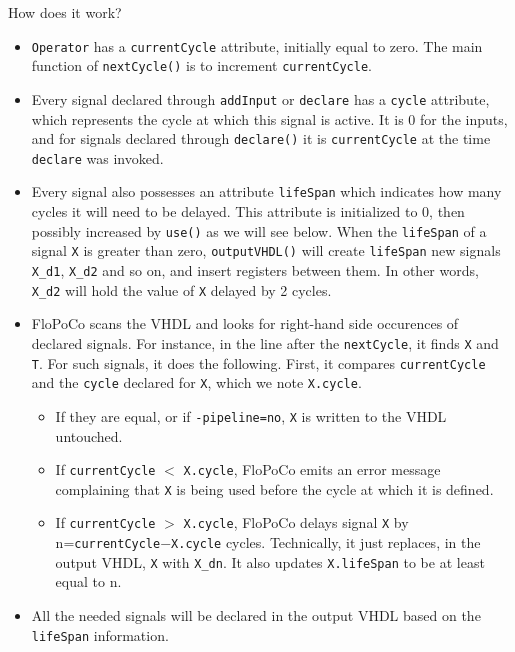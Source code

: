 \documentclass{article}
\begin{document}
How does it work? 
\begin{itemize}\item 
  \verb!Operator! has a \verb!currentCycle! attribute, initially equal to
  zero. The main function of 	\verb!nextCycle()! is to increment \verb!currentCycle!.

\item Every signal declared through \verb!addInput! or \verb!declare!
  has a \verb!cycle! attribute, which represents the cycle at which
  this signal is active. It is 0 for the inputs, and for signals
  declared through \verb!declare()! it is \verb!currentCycle!  at the
  time \verb!declare! was invoked.

\item Every signal also possesses an attribute \verb!lifeSpan! which
  indicates how many cycles it will need to be delayed. This attribute
  is initialized to 0, then possibly increased by \verb!use()! as we
  will see below. When the \verb!lifeSpan! of a signal \verb!X!  is
  greater than zero, \verb!outputVHDL()! will create \verb!lifeSpan!
  new signals \verb!X_d1!, \verb!X_d2! and so on, and insert registers
  between them. In other words, \verb!X_d2! will hold the value of
  \verb!X! delayed by 2 cycles.

\item FloPoCo scans the VHDL and looks for right-hand side occurences
  of declared signals. For instance, in the line after the
  \verb!nextCycle!, it finds \verb!X! and \verb!T!. For such signals, it does the following. First,
  it compares \verb!currentCycle! and the
  \verb!cycle! declared for \verb!X!, which we note \verb!X.cycle!.
  \begin{itemize}\item 
    If they are equal, or if \verb!-pipeline=no!, \verb!X! is written to the VHDL untouched.
  \item If \verb!currentCycle! $<$ \verb!X.cycle!, FloPoCo emits an error message complaining that \verb!X! is being
    used before the cycle at which it is defined.
  \item If \verb!currentCycle! $>$ \verb!X.cycle!, FloPoCo delays
    signal \verb!X! by n=\verb!currentCycle!$-$\verb!X.cycle!
    cycles. Technically, it just replaces, in the output VHDL,
    \verb!X! with \verb!X_dn!. It also updates \verb!X.lifeSpan! to be
    at least equal to n.
  \end{itemize}
\item All the needed signals will be declared in the output VHDL based
  on the \verb!lifeSpan! information.
\end{itemize}
\end{document}
